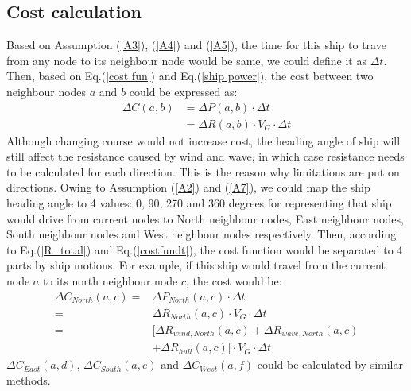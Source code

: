 \subsection{Cost calculation}
Based on Assumption (\ref{A3}), (\ref{A4}) and (\ref{A5}), the time for this ship to trave from any node to its neighbour node would be same, we could define it as $\Delta t$. Then, based on Eq.(\ref{cost fun}) and Eq.(\ref{ship power}), the cost between two neighbour nodes $a$ and $b$ could be expressed as:
\begin{equation}
    \begin{aligned}
        \Delta C(a,b)&=\Delta P(a,b) \cdot \Delta t \\
        &=\Delta R(a,b) \cdot V_{G} \cdot \Delta t
    \end{aligned}
    \label{costfundt}
\end{equation}
Although changing course would not increase cost, the heading angle of ship will still affect the resistance caused by wind and wave, in which case resistance needs to be calculated for each direction. This is the reason why limitations are put on directions. Owing to Assumption (\ref{A2}) and (\ref{A7}), we could map the ship heading angle to 4 values: 0, 90, 270 and 360 degrees for representing that ship would drive from current nodes to North neighbour nodes, East neighbour nodes, South neighbour nodes and West neighbour nodes respectively. Then, according to Eq.(\ref{R_total}) and Eq.(\ref{costfundt}), the cost function would be separated to 4 parts by ship motions. For example, if this ship would travel from the current node $a$ to its north neighbour node $c$, the cost would be:
\begin{equation}
    \begin{aligned}
        \Delta C_{North}(a,c)=&\Delta P_{North}(a,c) \cdot \Delta t \\
        =&\Delta R_{North}(a,c) \cdot V_{G} \cdot \Delta t \\
        =&[ \Delta R_{wind,North}(a,c)+\Delta R_{wave,North}(a,c) \\
        &+\Delta R_{hull}(a,c) ] \cdot V_{G} \cdot \Delta t
    \end{aligned}
\end{equation}
$\Delta C_{East}(a,d)$, $\Delta C_{South}(a,e)$ and $\Delta C_{West}(a,f)$ could be calculated by similar methods.
